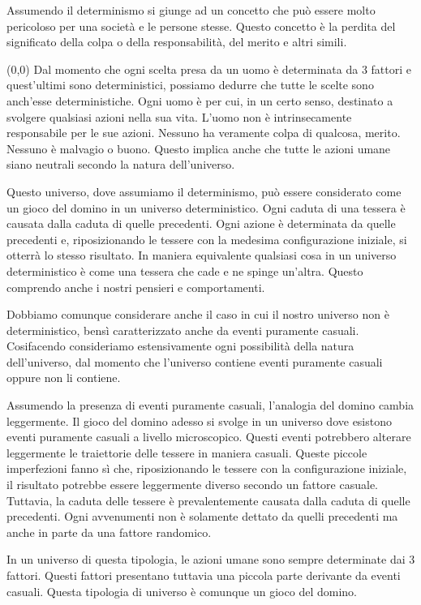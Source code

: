 \documentclass[a4paper, 12pt]{article}
\newcommand{\ownright}[0]{%
    \makebox(0,0){
        \stackon[8pt]{\phantom{A}}{
            \begin{tikzpicture}
                \fill (0,0) -- (0,0.3) -- ++(0.05,0) -- (0.05,0);
                \fill (0,0.3) -- ++(0.3,0) -- (0.3,0.25) -- (0.05,0.25);
            \end{tikzpicture}
        }
    }%
}
\begin{document}
Assumendo il determinismo si giunge ad un concetto che può essere molto pericoloso per una società
e le persone stesse. Questo concetto è la perdita del significato della colpa o della responsabilità, del merito e altri simili.

\ownright{}%
Dal momento che ogni scelta presa
da un uomo è determinata da 3 fattori e
quest'ultimi sono deterministici, possiamo
dedurre che tutte le scelte sono
anch'esse deterministiche.
Ogni uomo è per cui, in un certo senso, destinato a
svolgere qualsiasi azioni nella sua vita.
L'uomo non è intrinsecamente responsabile
per le sue azioni. Nessuno ha veramente colpa di qualcosa,
merito. Nessuno è malvagio o buono. Questo
implica anche che tutte le azioni umane siano
neutrali secondo la natura dell'universo.

Questo universo, dove assumiamo il determinismo, può essere considerato come un gioco del domino in un universo deterministico.
Ogni caduta di una tessera è causata dalla caduta di quelle precedenti. Ogni azione è determinata da quelle precedenti
e, riposizionando le tessere con la medesima configurazione
iniziale, si otterrà lo stesso risultato.
In maniera equivalente qualsiasi cosa in un 
universo deterministico è come una tessera che cade
e ne spinge un'altra. Questo comprendo anche i nostri
pensieri e comportamenti.

Dobbiamo comunque considerare anche il caso in cui
il nostro universo non è deterministico, bensì
caratterizzato anche da eventi puramente casuali.
Cosifacendo consideriamo estensivamente ogni possibilità
della natura dell'universo, dal momento che
l'universo contiene eventi puramente casuali oppure
non li contiene.

Assumendo la presenza di eventi puramente casuali,
l'analogia del domino cambia leggermente.
Il gioco del domino adesso si svolge in un universo
dove esistono eventi puramente casuali a livello microscopico.
Questi eventi potrebbero alterare leggermente
le traiettorie delle tessere in maniera casuali.
Queste piccole imperfezioni fanno sì che,
riposizionando le tessere con la configurazione iniziale,
il risultato potrebbe essere leggermente diverso
secondo un fattore casuale. Tuttavia,
la caduta delle tessere è prevalentemente
causata dalla caduta di quelle precedenti.
Ogni avvenumenti non è solamente dettato da quelli precedenti
ma anche in parte da una fattore randomico.

In un universo di questa tipologia, le azioni umane
sono sempre determinate dai 3 fattori.
Questi fattori presentano tuttavia una piccola
parte derivante da eventi casuali.
Questa tipologia di universo è comunque un gioco
del domino.
\end{document}
